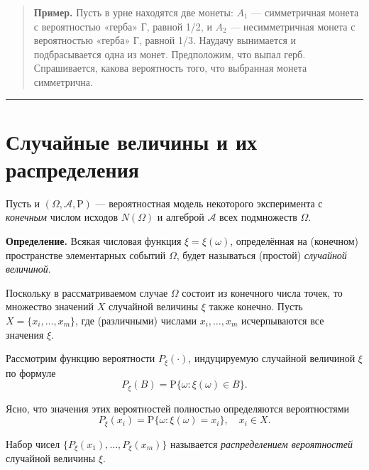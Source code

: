 \documentclass[11pt,a4paper]{article}
\begin{document}
\begin{quote}
\textbf{Пример.} Пусть в урне находятся две монеты: \(A_1\) ---
симметричная монета с вероятностью «герба» Г, равной 1/2, и \(A_2\) ---
несимметричная монета с вероятностью «герба» Г, равной 1/3. Наудачу
вынимается и подбрасывается одна из монет. Предположим, что выпал герб.
Спрашивается, какова вероятность того, что выбранная монета симметрична.
\end{quote}

    \begin{center}\rule{0.5\linewidth}{\linethickness}\end{center}

    \hypertarget{ux441ux43bux443ux447ux430ux439ux43dux44bux435-ux432ux435ux43bux438ux447ux438ux43dux44b-ux438-ux438ux445-ux440ux430ux441ux43fux440ux435ux434ux435ux43bux435ux43dux438ux44f}{%
\section{Случайные величины и их
распределения}\label{ux441ux43bux443ux447ux430ux439ux43dux44bux435-ux432ux435ux43bux438ux447ux438ux43dux44b-ux438-ux438ux445-ux440ux430ux441ux43fux440ux435ux434ux435ux43bux435ux43dux438ux44f}}

Пусть и \((\Omega, \mathcal{A}, \mathrm{P})\) --- вероятностная модель
некоторого эксперимента с \emph{конечным} числом исходов \(N(\Omega)\) и
алгеброй \(\mathcal{A}\) всех подмножеств \(\Omega\).

\textbf{Определение.} Всякая числовая функция \(\xi = \xi(\omega)\),
определённая на (конечном) пространстве элементарных событий \(\Omega\),
будет называться (простой) \emph{случайной величиной}.

Поскольку в рассматриваемом случае \(\Omega\) состоит из конечного числа
точек, то множество значений \(X\) случайной величины \(\xi\) также
конечно. Пусть \(X = \{x_i, \ldots, x_m\}\), где (различными) числами
\(x_i, \ldots, x_m\) исчерпываются все значения \(\xi\).

Рассмотрим функцию вероятности \(P_\xi(\cdot)\), индуцируемую случайной
величиной \(\xi\) по формуле
\[ P_\xi(B) = \mathrm{P}\{\omega: \xi(\omega) \in B\}. \]

Ясно, что значения этих вероятностей полностью определяются
вероятностями
\[ P_\xi(x_i) = \mathrm{P}\{\omega: \xi(\omega) = x_i\}, \quad x_i \in X. \]

Набор чисел \(\{ P_\xi(x_1), \ldots , P_\xi(x_m) \}\) называется
\emph{распределением вероятностей} случайной величины \(\xi\).
\end{document}
